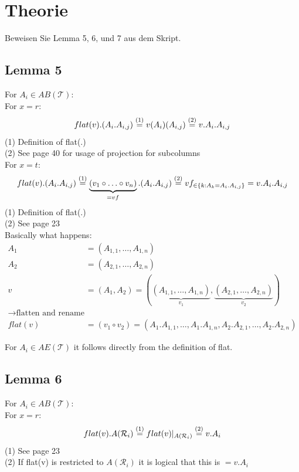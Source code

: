 
\section{Theorie}

Beweisen Sie Lemma 5, 6, und 7 aus dem Skript.

\begin{solutionbox}
  \newpage
  \subsection{Lemma 5}
  For $A_i \in AB(\mathcal{T})$:\\
  For $x=r$:
  \[
    flat(v).(A_i.A_{i,j}) \stackrel{\text{(1)}}{=} v(A_i)(A_{i,j}) \stackrel{\text{(2)}}{=} v.A_i.A_{i,j}
  \]
  (1) Definition of flat(.) \\ (2) See page 40 for usage of projection for subcolumns \\

  For $x=t$:
  \begin{equation*}
    flat(v).(A_i.A_{i,j}) \stackrel{\text{(1)}}{=} \underbrace{(v_1 \circ \ldots \circ v_n)}_{=vf}.(A_i.A_{i,j})  \stackrel{\text{(2)}}{=} vf_{\in\{k:A_k = A_i.A_{i,j}\}} = v.A_i.A_{i,j}
  \end{equation*}
  (1) Definition of flat(.) \\ (2) See page 23 \\ Basically what happens: 
  \begin{align*}
    A_1 & = (A_{1,1},\ldots,A_{1,n}) \\
    A_2 & = (A_{2,1},\ldots,A_{2,n}) \\
    v & = (A_1,A_2) = (\underbrace{(A_{1,1},\ldots,A_{1,n})}_{v_1},\underbrace{(A_{2,1},\ldots,A_{2,n})}_{v_2}) \\
    \longrightarrow \text{flatten and rename} \\
    flat(v) & = (v_1 \circ v_2) = (A_1.A_{1,1},\ldots,A_1.A_{1,n},A_2.A_{2,1},\ldots,A_2.A_{2,n})
  \end{align*}
  
  For $A_i \in AE(\mathcal{T})$ it follows directly from the definition of flat.
  \subsection{Lemma 6}
  For $A_i \in AB(\mathcal{T})$:\\
  For $x=r$:
  \[
    flat(v).A(\mathcal{R}_i) \stackrel{\text{(1)}}{=} flat(v)|_{A(\mathcal{R}_i)} \stackrel{\text{(2)}}{=} v.A_i
  \]
  (1) See page 23 \\ (2) If flat(v) is restricted to $A(\mathcal{R}_i)$ it is logical that this is $=v.A_i$


\end{solutionbox}
